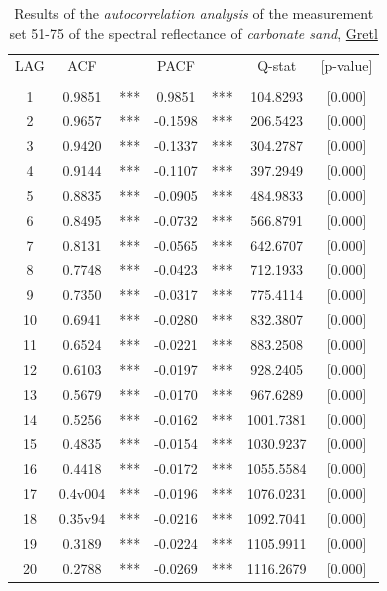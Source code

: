 \documentclass[10pt, a4paper]{article}
\begin{document}
\begin{appendices}
\begin{table}[htbp]
	\caption{Results of the \textit{autocorrelation analysis} of the measurement set 51-75 of the spectral reflectance of \textit{carbonate sand}, \href{http://gretl.sourceforge.net/}{Gretl}}
	\begin{center}
	\begin{tabular}{|c c c c c c c||}
		\hline\hline
		LAG & ACF & & PACF & & Q-stat & [p-value] \\ \\ \hline\hline
		1  & 0.9851 & ***  & 0.9851& ***   & 104.8293 & [0.000]\\ \hline
		    2  & 0.9657  &***  &-0.1598  &   ***  &  206.5423  &[0.000]\\ \hline
		    3  & 0.9420  &***  &-0.1337  &  ***   &  304.2787  &[0.000]\\ \hline
		    4  & 0.9144  &***  &-0.1107  &  ***   &  397.2949  &[0.000]\\ \hline
		    5  & 0.8835  &***  &-0.0905  &  ***   &  484.9833  &[0.000]\\ \hline
		    6  & 0.8495 & ***  &-0.0732  &  ***   &  566.8791  &[0.000]\\ \hline
		    7  & 0.8131 & ***  &-0.0565  &  ***   &  642.6707  &[0.000]\\ \hline
		    8  & 0.7748 & ***  &-0.0423  &  ***   &  712.1933  &[0.000]\\ \hline
		    9  & 0.7350 & ***  &-0.0317  &  ***   &  775.4114  &[0.000]\\ \hline
		   10 &  0.6941&  *** & -0.0280 &  ***   &   832.3807 & [0.000]\\ \hline
		   11 &  0.6524 & *** & -0.0221 &  ***   &   883.2508 & [0.000]\\ \hline
		   12 &  0.6103 & *** & -0.0197 &  ***   &   928.2405 & [0.000]\\ \hline
		   13 &  0.5679 & *** & -0.0170 &  ***   &   967.6289 & [0.000]\\ \hline
		   14 &  0.5256 & *** & -0.0162 &  ***   &  1001.7381&  [0.000]\\ \hline
		   15 &  0.4835 & *** & -0.0154 &  ***   &  1030.9237 & [0.000]\\ \hline
		   16 & 0.4418 & *** & -0.0172  &  ***  &  1055.5584 & [0.000]\\ \hline
		   17  & 0.4v004 & *** & -0.0196 &***     &  1076.0231 & [0.000]\\ \hline
		   18 & 0.35v94 & *** & -0.0216  & ***   &  1092.7041 & [0.000]\\ \hline
		   19 &  0.3189 & *** & -0.0224   & ***  &  1105.9911 & [0.000]\\ \hline
		   20 &  0.2788 & *** & -0.0269   & ***  &  1116.2679 & [0.000]\\ \hline
	\end{tabular}
	\end{center}
	\label{tab:28}
\end{table}
\pagebreak


\end{appendices}
\end{document}
